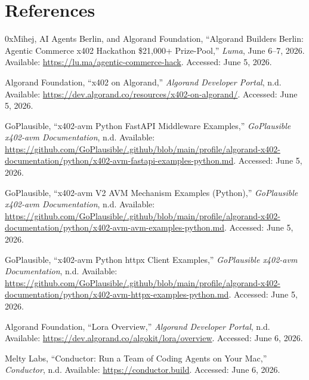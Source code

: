 \documentclass[11pt]{article}
\begin{document}
\section{References}

\begin{sloppypar}
\begin{enumerate}[label={[\arabic*]},leftmargin=*]
  \item 0xMihej, AI Agents Berlin, and Algorand Foundation,
  ``Algorand Builders Berlin: Agentic Commerce x402 Hackathon \$21,000+
  Prize-Pool,'' \textit{Luma}, June 6--7, 2026. Available:
  \url{https://lu.ma/agentic-commerce-hack}.
  Accessed: June 5, 2026.

  \item Algorand Foundation, ``x402 on Algorand,'' \textit{Algorand
  Developer Portal}, n.d. Available:
  \url{https://dev.algorand.co/resources/x402-on-algorand/}.
  Accessed: June 5, 2026.

  \item GoPlausible, ``x402-avm Python FastAPI Middleware Examples,''
  \textit{GoPlausible x402-avm Documentation}, n.d. Available:
  \url{https://github.com/GoPlausible/.github/blob/main/profile/algorand-x402-documentation/python/x402-avm-fastapi-examples-python.md}.
  Accessed: June 5, 2026.

  \item GoPlausible, ``x402-avm V2 AVM Mechanism Examples (Python),''
  \textit{GoPlausible x402-avm Documentation}, n.d. Available:
  \url{https://github.com/GoPlausible/.github/blob/main/profile/algorand-x402-documentation/python/x402-avm-avm-examples-python.md}.
  Accessed: June 5, 2026.

  \item GoPlausible, ``x402-avm Python httpx Client Examples,''
  \textit{GoPlausible x402-avm Documentation}, n.d. Available:
  \url{https://github.com/GoPlausible/.github/blob/main/profile/algorand-x402-documentation/python/x402-avm-httpx-examples-python.md}.
  Accessed: June 5, 2026.

  \item Algorand Foundation, ``Lora Overview,'' \textit{Algorand Developer
  Portal}, n.d. Available:
  \url{https://dev.algorand.co/algokit/lora/overview}.
  Accessed: June 6, 2026.

  \item Melty Labs, ``Conductor: Run a Team of Coding Agents on Your Mac,''
  \textit{Conductor}, n.d. Available:
  \url{https://conductor.build}.
  Accessed: June 6, 2026.


\end{enumerate}
\end{sloppypar}
\end{document}
